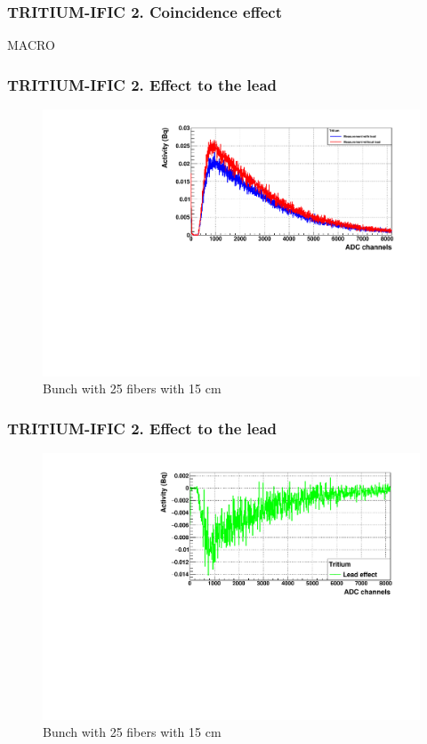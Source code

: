 \documentclass{beamer}
\begin{document}
\begin{frame}
\frametitle{TRITIUM-IFIC 2. Coincidence effect}

MACRO

\end{frame}

\begin{frame}
\frametitle{TRITIUM-IFIC 2. Effect to the lead}

\begin{figure}[hbtp]
\centering
\includegraphics[scale=0.5]{TRITIUM2/With_without_lead.pdf}
\caption{Bunch with 25 fibers with 15 cm}
\end{figure}

\end{frame}

\begin{frame}
\frametitle{TRITIUM-IFIC 2. Effect to the lead}

\begin{figure}[hbtp]
\centering
\includegraphics[scale=0.5]{TRITIUM2/Lead_effect.pdf}
\caption{Bunch with 25 fibers with 15 cm}
\end{figure}

\end{frame}
\end{document}
